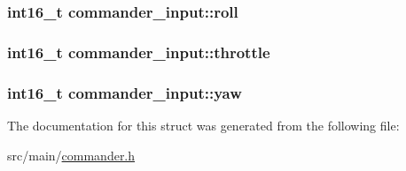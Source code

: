 \hypertarget{structcommander__input_a445354d0f0424514692cb1c1a4f9743f}{
\subsubsection[{roll}]{\setlength{\rightskip}{0pt plus 5cm}int16\+\_\+t commander\+\_\+input\+::roll}}\label{structcommander__input_a445354d0f0424514692cb1c1a4f9743f}
\hypertarget{structcommander__input_a5b218002b832b58b60029552503a2dc3}{
\subsubsection[{throttle}]{\setlength{\rightskip}{0pt plus 5cm}int16\+\_\+t commander\+\_\+input\+::throttle}}\label{structcommander__input_a5b218002b832b58b60029552503a2dc3}
\hypertarget{structcommander__input_a1ce80590f36695999cc0b15f29b8449b}{
\subsubsection[{yaw}]{\setlength{\rightskip}{0pt plus 5cm}int16\+\_\+t commander\+\_\+input\+::yaw}}\label{structcommander__input_a1ce80590f36695999cc0b15f29b8449b}


The documentation for this struct was generated from the following file\+:\begin{DoxyCompactItemize}
\item 
src/main/\hyperlink{commander_8h}{commander.\+h}\end{DoxyCompactItemize}
